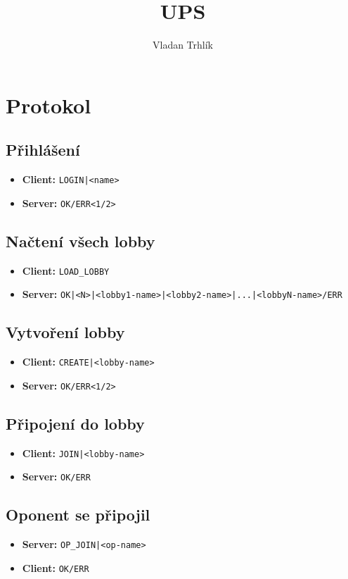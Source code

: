 \documentclass[11pt,a4paper]{article}
\author{Vladan Trhlík}
\title{UPS}
\begin{document}
\maketitle

\section{Protokol}

\subsection{Přihlášení}
\begin{itemize}
	\item \textbf{Client:} \texttt{LOGIN|<name>}
	\item \textbf{Server:} \texttt{OK/ERR<1/2>}
\end{itemize}

\subsection{Načtení všech lobby}
\begin{itemize}
	\item \textbf{Client:} \texttt{LOAD\_LOBBY}
	\item \textbf{Server:} \texttt{OK|<N>|<lobby1-name>|<lobby2-name>|...|<lobbyN-name>/ERR}
\end{itemize}

\subsection{Vytvoření lobby}
\begin{itemize}
	\item \textbf{Client:} \texttt{CREATE|<lobby-name>}
	\item \textbf{Server:} \texttt{OK/ERR<1/2>}
\end{itemize}

\subsection{Připojení do lobby}
\begin{itemize}
	\item \textbf{Client:} \texttt{JOIN|<lobby-name>}
	\item \textbf{Server:} \texttt{OK/ERR}
\end{itemize}

\subsection{Oponent se připojil}
\begin{itemize}
	\item \textbf{Server:} \texttt{OP\_JOIN|<op-name>}
	\item \textbf{Client:} \texttt{OK/ERR}
\end{itemize}
\end{document}
